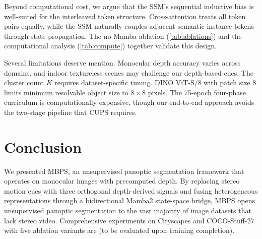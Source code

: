 \documentclass[10pt,twocolumn,letterpaper]{article}
\begin{document}
Beyond computational cost, we argue that the SSM's sequential inductive bias is well-suited for the interleaved token structure. Cross-attention treats all token pairs equally, while the SSM naturally couples adjacent semantic-instance tokens through state propagation. The no-Mamba ablation (\cref{tab:ablations}) and the computational analysis (\cref{tab:compute}) together validate this design.

Several limitations deserve mention. Monocular depth accuracy varies across domains, and indoor textureless scenes may challenge our depth-based cues. The cluster count $K$ requires dataset-specific tuning. DINO ViT-S/8 with patch size 8 limits minimum resolvable object size to $8{\times}8$ pixels. The 75-epoch four-phase curriculum is computationally expensive, though our end-to-end approach avoids the two-stage pipeline that CUPS requires.


\section{Conclusion}
\label{sec:conclusion}

We presented MBPS, an unsupervised panoptic segmentation framework that operates on monocular images with precomputed depth. By replacing stereo motion cues with three orthogonal depth-derived signals and fusing heterogeneous representations through a bidirectional Mamba2 state-space bridge, MBPS opens unsupervised panoptic segmentation to the vast majority of image datasets that lack stereo video. Comprehensive experiments on Cityscapes and COCO-Stuff-27 with five ablation variants are \underline{\hspace{2em}} (to be evaluated upon training completion).


\end{document}
